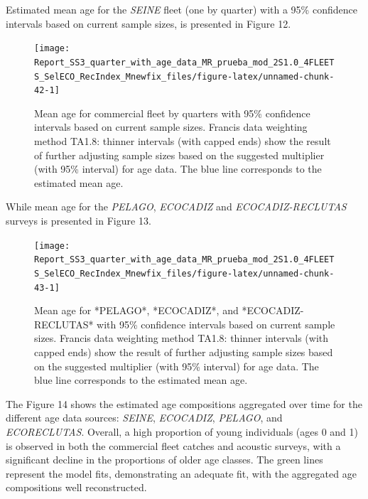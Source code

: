 \documentclass[
]{article}
\begin{document}
Estimated mean age for the \emph{SEINE} fleet (one by quarter) with a
95\% confidence intervals based on current sample sizes, is presented in
Figure 12.

\begin{figure}[H]

{\centering \texttt{[image: Report\_SS3\_quarter\_with\_age\_data\_MR\_prueba\_mod\_2S1.0\_4FLEETS\_SelECO\_RecIndex\_Mnewfix\_files/figure-latex/unnamed-chunk-42-1]} 

}

\caption{Mean age for commercial fleet by quarters with 95\% confidence intervals based on current sample sizes. Francis data weighting method TA1.8: thinner intervals (with capped ends) show the result of further adjusting sample sizes based on the suggested multiplier (with 95\% interval) for age data. The blue line corresponds to the estimated mean age.}\label{fig:unnamed-chunk-42}
\end{figure}

While mean age for the \emph{PELAGO}, \emph{ECOCADIZ} and
\emph{ECOCADIZ-RECLUTAS} surveys is presented in Figure 13.

\begin{figure}[H]

{\centering \texttt{[image: Report\_SS3\_quarter\_with\_age\_data\_MR\_prueba\_mod\_2S1.0\_4FLEETS\_SelECO\_RecIndex\_Mnewfix\_files/figure-latex/unnamed-chunk-43-1]} 

}

\caption{Mean age for *PELAGO*, *ECOCADIZ*, and *ECOCADIZ-RECLUTAS* with 95\% confidence intervals based on current sample sizes. Francis data weighting method TA1.8: thinner intervals (with capped ends) show the result of further adjusting sample sizes based on the suggested multiplier (with 95\% interval) for age data. The blue line corresponds to the estimated mean age.}\label{fig:unnamed-chunk-43}
\end{figure}

The Figure 14 shows the estimated age compositions aggregated over time
for the different age data sources: \emph{SEINE}, \emph{ECOCADIZ},
\emph{PELAGO}, and \emph{ECORECLUTAS}. Overall, a high proportion of
young individuals (ages 0 and 1) is observed in both the commercial
fleet catches and acoustic surveys, with a significant decline in the
proportions of older age classes. The green lines represent the model
fits, demonstrating an adequate fit, with the aggregated age
compositions well reconstructed.
\end{document}

